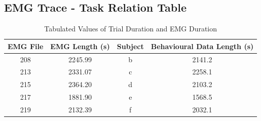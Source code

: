 \begin{appendices}
\section{EMG Trace - Task Relation Table}
\begin{table}[H]
    \begin{center}
        \caption{Tabulated Values of Trial Duration and EMG Duration}
        \label{tab:EMG_Relation_Table}
        \begin{tabular}{c|c|c|c}\hline
            EMG File & EMG Length (s) & Subject & Behavioural Data Length (s)\\\hline
            208     &   2245.99  & b & 2141.2 \\
            213     &   2331.07  & c & 2258.1 \\
            215     &   2364.20 &   d   &   2103.2\\
            217     &   1881.90 &   e   &   1568.5\\
            219     &   2132.39 &   f   &   2032.1\\\hline
        \end{tabular}
    \end{center}
\end{table}


\end{appendices}
